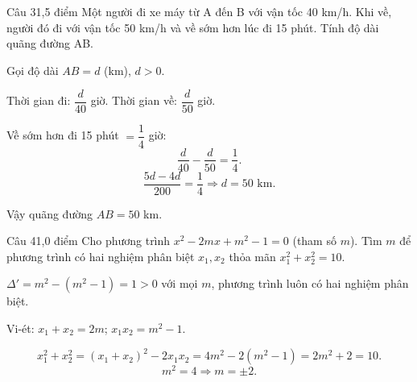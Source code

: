 \begin{de_cau}{Câu 3}{1,5 điểm}
Một người đi xe máy từ A đến B với vận tốc 40 km/h. Khi về, người đó đi với vận tốc 50 km/h và về
sớm hơn lúc đi 15 phút. Tính độ dài quãng đường AB.
\end{de_cau}

\begin{loi_giai_cau}
Gọi độ dài $AB = d$ (km), $d>0$.

Thời gian đi: $\dfrac{d}{40}$ giờ. Thời gian về: $\dfrac{d}{50}$ giờ.

Về sớm hơn đi 15 phút $= \dfrac{1}{4}$ giờ:
\[\frac{d}{40} - \frac{d}{50} = \frac{1}{4}.\]
\[\frac{5d-4d}{200} = \frac{1}{4} \Rightarrow d = 50 \text{ km}.\]

Vậy quãng đường $AB = \boxed{50}$ km.
\end{loi_giai_cau}

\begin{de_cau}{Câu 4}{1,0 điểm}
Cho phương trình $x^2 - 2mx + m^2 - 1 = 0$ (tham số $m$). Tìm $m$ để phương trình có hai nghiệm
phân biệt $x_1, x_2$ thỏa mãn $x_1^2 + x_2^2 = 10$.
\end{de_cau}

\begin{loi_giai_cau}
$\Delta' = m^2 - (m^2-1) = 1 > 0$ với mọi $m$, phương trình luôn có hai nghiệm phân biệt.

Vi-ét: $x_1+x_2=2m$;\; $x_1x_2=m^2-1$.

\[x_1^2+x_2^2 = (x_1+x_2)^2-2x_1x_2 = 4m^2-2(m^2-1) = 2m^2+2 = 10.\]
\[m^2=4\Rightarrow\boxed{m=\pm 2}.\]
\end{loi_giai_cau}
